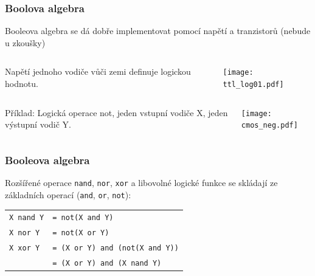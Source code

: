 \documentclass{beamer}
\begin{document}
\begin{frame}
\frametitle{Boolova algebra}

Booleova algebra se dá dobře implementovat pomocí napětí a tranzistorů (nebude u zkoušky)

\begin{columns}
\begin{column}{0.45\textwidth}
Napětí jednoho vodiče vůči zemi definuje logickou hodnotu.
\end{column}
\begin{column}{0.55\textwidth}  
\begin{center}
   \texttt{[image: ttl\_log01.pdf]}
\end{center}
\end{column}
\end{columns}

\begin{columns}
\begin{column}{0.45\textwidth}
Příklad: Logická operace not, jeden vstupní vodiče X, jeden výstupní vodič Y.
\end{column}
\begin{column}{0.55\textwidth}  
\begin{center}
   \texttt{[image: cmos\_neg.pdf]}
\end{center}
\end{column}
\end{columns}


\end{frame}

\begin{frame}
\frametitle{Booleova algebra}

Rozšířené operace \texttt{nand}, \texttt{nor}, \texttt{xor} a libovolné logické funkce se skládají ze základních operací (\texttt{and}, \texttt{or}, \texttt{not}):

\begin{tabular}{ll}
\texttt{X nand Y} & \texttt{= not(X and Y)}\\
\texttt{X nor Y} & \texttt{= not(X or Y)}\\
\texttt{X xor Y} & \texttt{= (X or Y) and (not(X and Y))}\\
& \texttt{= (X or Y) and (X nand Y)}\\
\end{tabular}


\end{frame}
\end{document}
